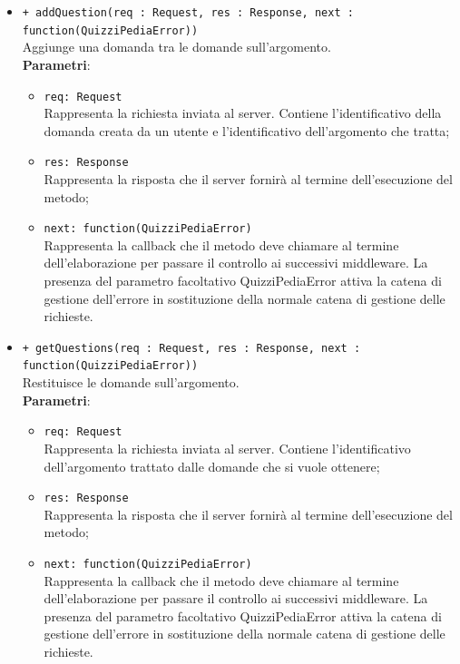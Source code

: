 \begin{itemize}
\begin{itemize}
\begin{itemize}
			\end{itemize}
			\item \texttt{+ addQuestion(req : Request, res : Response, next : function(QuizziPediaError))} \\
			Aggiunge una domanda tra le domande sull'argomento.  \\
			\textbf{Parametri}:
			\begin{itemize}
			\item \texttt{req: Request} \\
			Rappresenta la richiesta inviata al server. Contiene l'identificativo della domanda creata da un utente e l'identificativo dell'argomento che tratta;
			\item \texttt{res: Response} \\
			Rappresenta la risposta che il server fornirà al termine dell'esecuzione del metodo;
			\item \texttt{next: function(QuizziPediaError)} \\
			Rappresenta la callback che il metodo deve chiamare al termine dell'elaborazione per passare il controllo ai successivi middleware. La presenza del parametro facoltativo QuizziPediaError attiva la catena di gestione dell'errore in sostituzione della normale catena di gestione delle richieste.
			\end{itemize}
			\item \texttt{+ getQuestions(req : Request, res : Response, next : function(QuizziPediaError))} \\
			Restituisce le domande sull'argomento.  \\
			\textbf{Parametri}:
			\begin{itemize}
			\item \texttt{req: Request} \\
			Rappresenta la richiesta inviata al server. Contiene l'identificativo dell'argomento trattato dalle domande che si vuole ottenere;
			\item \texttt{res: Response} \\
			Rappresenta la risposta che il server fornirà al termine dell'esecuzione del metodo;
			\item \texttt{next: function(QuizziPediaError)} \\
			Rappresenta la callback che il metodo deve chiamare al termine dell'elaborazione per passare il controllo ai successivi middleware. La presenza del parametro facoltativo QuizziPediaError attiva la catena di gestione dell'errore in sostituzione della normale catena di gestione delle richieste.

\end{itemize}
\end{itemize}
\end{itemize}
